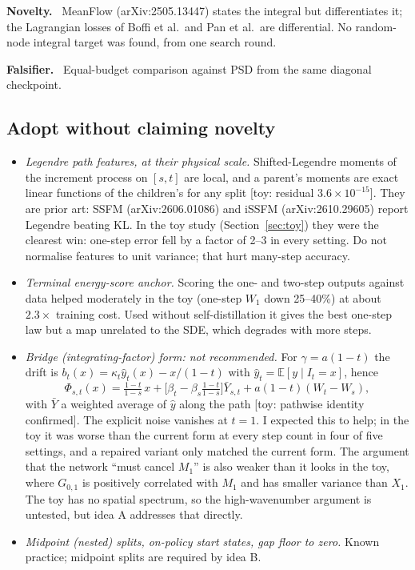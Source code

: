 \documentclass[11pt,a4paper]{article}
\newcommand{\E}{\mathbb{E}}
\newcommand{\status}[1]{\textsf{\small\color{black!60}[#1]}}
\newcommand{\head}[1]{\par\smallskip\noindent\textbf{#1}\ }
\begin{document}
\head{Novelty.} MeanFlow (arXiv:2505.13447) states the integral but differentiates it; the Lagrangian losses of Boffi et al.\ and Pan et al.\ are differential. No random-node integral target was found, from one search round.

\head{Falsifier.} Equal-budget comparison against PSD from the same diagonal checkpoint.

\subsection*{Adopt without claiming novelty}\label{sec:hygiene}

\begin{itemize}
\item \emph{Legendre path features, at their physical scale.} Shifted-Legendre moments of the increment process on $[s,t]$ are local, and a parent's moments are exact linear functions of the children's for any split \status{toy: residual $3.6\times10^{-15}$}. They are prior art: SSFM (arXiv:2606.01086) and iSSFM (arXiv:2610.29605) report Legendre beating KL. In the toy study (Section~\ref{sec:toy}) they were the clearest win: one-step error fell by a factor of 2--3 in every setting. Do not normalise features to unit variance; that hurt many-step accuracy.
\item \emph{Terminal energy-score anchor.} Scoring the one- and two-step outputs against data helped moderately in the toy (one-step $W_1$ down 25--40\%) at about $2.3\times$ training cost. Used without self-distillation it gives the best one-step law but a map unrelated to the SDE, which degrades with more steps.
\item \emph{Bridge (integrating-factor) form: not recommended.} For $\gamma=a(1-t)$ the drift is $b_t(x)=\kappa_t\hat y_t(x)-x/(1-t)$ with $\hat y_t=\E[y\mid I_t=x]$, hence
\[
\Phi_{s,t}(x)=\tfrac{1-t}{1-s}\,x+\Big[\beta_t-\beta_s\tfrac{1-t}{1-s}\Big]\bar Y_{s,t}+a(1-t)(W_t-W_s),
\]
with $\bar Y$ a weighted average of $\hat y$ along the path \status{toy: pathwise identity confirmed}. The explicit noise vanishes at $t=1$. I expected this to help; in the toy it was worse than the current form at every step count in four of five settings, and a repaired variant only matched the current form. The argument that the network ``must cancel $M_1$'' is also weaker than it looks in the toy, where $G_{0,1}$ is positively correlated with $M_1$ and has smaller variance than $X_1$. The toy has no spatial spectrum, so the high-wavenumber argument is untested, but idea A addresses that directly.
\item \emph{Midpoint (nested) splits, on-policy start states, gap floor to zero.} Known practice; midpoint splits are required by idea B.
\end{itemize}
\end{document}
